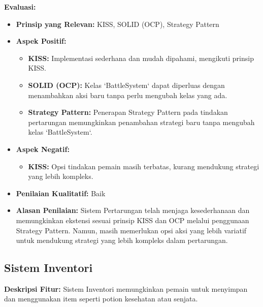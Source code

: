 \documentclass[12pt]{article}
\begin{document}
\textbf{Evaluasi:}
\begin{itemize}
    \item \textbf{Prinsip yang Relevan:} KISS, SOLID (OCP), Strategy Pattern
    \item \textbf{Aspek Positif:}
    \begin{itemize}
        \item \textbf{KISS:} Implementasi sederhana dan mudah dipahami, mengikuti prinsip KISS.
        \item \textbf{SOLID (OCP):} Kelas `BattleSystem` dapat diperluas dengan menambahkan aksi baru tanpa perlu mengubah kelas yang ada.
        \item \textbf{Strategy Pattern:} Penerapan Strategy Pattern pada tindakan pertarungan memungkinkan penambahan strategi baru tanpa mengubah kelas `BattleSystem`.
    \end{itemize}
    \item \textbf{Aspek Negatif:}
    \begin{itemize}
        \item \textbf{KISS:} Opsi tindakan pemain masih terbatas, kurang mendukung strategi yang lebih kompleks.
    \end{itemize}
    \item \textbf{Penilaian Kualitatif:} Baik
    \item \textbf{Alasan Penilaian:} Sistem Pertarungan telah menjaga kesederhanaan dan memungkinkan ekstensi sesuai prinsip KISS dan OCP melalui penggunaan Strategy Pattern. Namun, masih memerlukan opsi aksi yang lebih variatif untuk mendukung strategi yang lebih kompleks dalam pertarungan.
\end{itemize}

\subsection{Sistem Inventori}
\textbf{Deskripsi Fitur:} Sistem Inventori memungkinkan pemain untuk menyimpan dan menggunakan item seperti potion kesehatan atau senjata.
\end{document}
